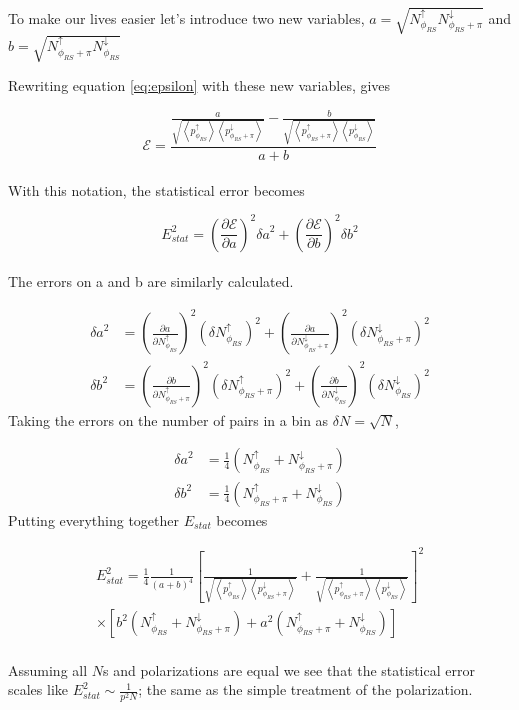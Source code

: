 \documentclass[abstract = on,listof=totoc, bibliography=totoc]{scrreprt}
\newcommand{\phirs}{\phi_{RS}}
\begin{document}
To make our lives easier let's introduce two new variables, $a = \sqrt{N^\uparrow_{\phi_{RS}}N^\downarrow_{\phi_{RS}+\pi}}$ and $b = \sqrt{N^\uparrow_{\phi_{RS}+\pi}N^\downarrow_{\phi_{RS}}}$

Rewriting equation \ref{eq:epsilon} with these new variables, gives

\begin{equation}
\label{eq:epsilonAB}
\mathcal{E} = \frac{\frac{a}{\sqrt{\left<p^\uparrow_{\phirs}\right>\left<p^\downarrow_{\phirs+\pi}\right>}}  - \frac{b}{\sqrt{\left<p^\uparrow_{\phirs+\pi}\right>\left<p^\downarrow_{\phirs}\right>}}} {a+b}
\end{equation}\\
%
With this notation, the statistical error becomes

\begin{equation}
\label{eq:Estat}
E_{stat}^2 = \left(\frac{\partial \mathcal{E}}{\partial a}\right)^2 {\delta a}^2 + \left(\frac{\partial \mathcal{E}}{\partial b}\right)^2 {\delta b}^2
\end{equation}\\
%
The errors on a and b are similarly calculated. 


\begin{align}
{\delta a}^2 &= \left(\frac{\partial a}{\partial N^\uparrow_{\phirs}}\right)^2 \left(\delta N^\uparrow_{\phirs}\right)^2 + \left(\frac{\partial a}{\partial N^\downarrow_{\phirs+\pi}}\right)^2 \left(\delta N^\downarrow_{\phirs+\pi}\right)^2 \\
{\delta b}^2 &= \left(\frac{\partial b}{\partial N^\uparrow_{\phirs+\pi}}\right)^2 \left(\delta N^\uparrow_{\phirs+\pi}\right)^2 + \left(\frac{\partial b}{\partial N^\downarrow_{\phirs}}\right)^2 \left(\delta N^\downarrow_{\phirs}\right)^2 
\end{align}
%
Taking the errors on the number of pairs in a bin as $\delta N = \sqrt{N}$,

\begin{align}
{\delta a}^2 &= \frac{1}{4}\left(N^\uparrow_{\phirs}+ N^\downarrow_{\phirs+\pi}\right)\\
{\delta b}^2 &=  \frac{1}{4}\left(N^\uparrow_{\phirs+\pi}+ N^\downarrow_{\phirs}\right)
\end{align}
%
Putting everything together $E_{stat}$ becomes

\begin{align}
E_{stat}^2 = \frac{1}{4}\frac{1}{\left(a+b\right)^4} \left[\frac{1}{\sqrt{\left<p^\uparrow_{\phirs}\right>\left<p^\downarrow_{\phirs+\pi}\right>}}+\frac{1}{\sqrt{\left<p^\uparrow_{\phirs+\pi}\right>\left<p^\downarrow_{\phirs}\right>}}\right]^2 \\ \nonumber
\times \left[b^2\left(N^\uparrow_{\phirs} + N^\downarrow_{\phirs+\pi}\right) + a^2 \left(N^\uparrow_{\phirs+\pi} +  N^\downarrow_{\phirs} \right)\right]
\end{align}\\
%
Assuming all $N$s and polarizations are equal we see that the statistical error scales like $E_{stat}^2 \sim \frac{1}{p^2 N}$; the same as the simple treatment of the polarization.
\end{document}
